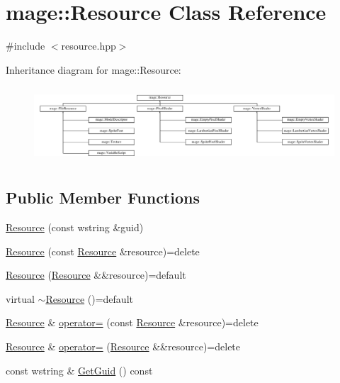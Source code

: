 \hypertarget{classmage_1_1_resource}{}\section{mage\+:\+:Resource Class Reference}
\label{classmage_1_1_resource}


{\ttfamily \#include $<$resource.\+hpp$>$}

Inheritance diagram for mage\+:\+:Resource\+:\begin{figure}[H]
\begin{center}
\leavevmode
\includegraphics[height=2.857143cm]{classmage_1_1_resource}
\end{center}
\end{figure}
\subsection*{Public Member Functions}
\begin{DoxyCompactItemize}
\item 
\hyperlink{classmage_1_1_resource_a3e2540455d88e1825a680fb4e7fe25c4}{Resource} (const wstring \&guid)
\item 
\hyperlink{classmage_1_1_resource_a4ee2dba2675546b603e03a69a2f2db52}{Resource} (const \hyperlink{classmage_1_1_resource}{Resource} \&resource)=delete
\item 
\hyperlink{classmage_1_1_resource_a48b6219dc7c2366d097dd462fb5448b4}{Resource} (\hyperlink{classmage_1_1_resource}{Resource} \&\&resource)=default
\item 
virtual \hyperlink{classmage_1_1_resource_a26cea6261aac321d95ac745703f1a3e8}{$\sim$\+Resource} ()=default
\item 
\hyperlink{classmage_1_1_resource}{Resource} \& \hyperlink{classmage_1_1_resource_ad8fa57f37eb253b90d18d33383b12875}{operator=} (const \hyperlink{classmage_1_1_resource}{Resource} \&resource)=delete
\item 
\hyperlink{classmage_1_1_resource}{Resource} \& \hyperlink{classmage_1_1_resource_a5d087980bb8fb1cd7d96c22d9e0eb519}{operator=} (\hyperlink{classmage_1_1_resource}{Resource} \&\&resource)=delete
\item 
const wstring \& \hyperlink{classmage_1_1_resource_a4e05079ab19ef95e11cefa487690fd25}{Get\+Guid} () const
\end{DoxyCompactItemize}
